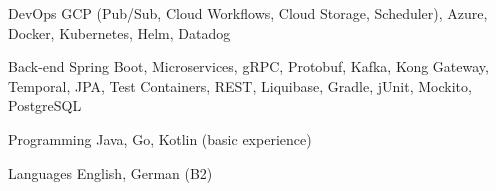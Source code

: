 

\begin{cvskills}

  \cvskill
    {DevOps} %
    {GCP (Pub/Sub, Cloud Workflows, Cloud Storage, Scheduler), Azure, Docker, Kubernetes, Helm, Datadog} %

  \cvskill
    {Back-end} %
    {Spring Boot, Microservices, gRPC, Protobuf, Kafka, Kong Gateway, Temporal, JPA, Test Containers, REST, Liquibase, Gradle, jUnit, Mockito, PostgreSQL} %

  \cvskill
    {Programming} %
    {Java, Go, Kotlin (basic experience)} %

  \cvskill
    {Languages} %
    {English, German (B2)} %

\end{cvskills}
